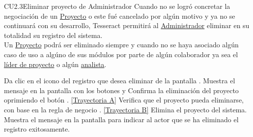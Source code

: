 	\begin{UseCase}{CU2.3}{Eliminar proyecto de Administrador}{
			Cuando no se logró concretar la negociación de un \hyperlink{proyectoEntidad}{Proyecto} o este fué cancelado por algún motivo y ya no se continuará con su desarrollo, Tesseract permitirá al {\hyperlink{admin}{Administrador}} eliminar en su totalidad su registro del sistema. \\
			Un \hyperlink{proyectoEntidad}{Proyecto} podrá ser eliminado siempre y cuando no se haya asociado algún caso de uso a algúno de sus módulos por parte de algún colaborador ya sea el {\hyperlink{jefe}{líder de proyecto}} o algún {\hyperlink{analista}{analista}}.
	}
	\end{UseCase}
	\begin{UCtrayectoria}
		\UCpaso[\UCactor] Da clic en el icono \eliminar del registro que desea eliminar de la pantalla .
		\UCpaso[\UCsist] Muestra el mensaje  en la pantalla  con los botones  y 
		\UCpaso[\UCactor] Confirma la eliminación del proyecto oprimiendo el botón . \hyperlink{CU2-3:TAA}{[Trayectoria A]}
		\UCpaso[\UCsist] Verifica que el proyecto pueda eliminarse, con base en la regla de negocio . \hyperlink{CU2-3:TAB}{[Trayectoria B]}
		\UCpaso[\UCsist] Elimina el proyecto del sistema.
		\UCpaso[\UCsist] Muestra el mensaje  en la pantalla  para indicar al actor que se ha eliminado el registro exitosamente.
	\end{UCtrayectoria}		
